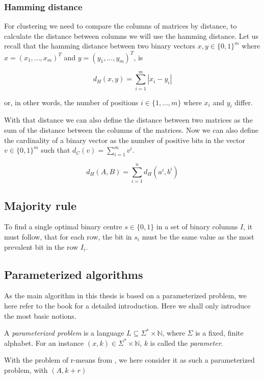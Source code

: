 \documentclass[a4paper]{article}
\begin{document}
\subsubsection{Hamming distance}
For clustering we need to compare the columns of matrices by distance, to calculate the distance
between columns we will use the hamming distance. Let us recall that the hamming distance
between two binary vectors $x,y \in \{0,1\}^m$ where $x=(x_1,...,x_m)^T$ and
$y=(y_1,...,y_m)^T$, is

\[
    d_H(x,y)= \sum_{i = 1}^{m} |x_i - y_i|
\]

or, in other words, the number of positions $i \in \{1,...,m\}$ where $x_i$ and $y_i$ differ.

With that distance we can
also define the distance between two matrices as the sum of the distance between the columns of
the matrices. Now we can also define the cardinality of a binary vector as the number of positive bits in
the vector $v \in \{0,1\}^m$ such that $d_C(v)=\sum_{i = 1}^{m} v^i$.

\[
    d_H(A,B) = \sum_{i = 1}^{n} d_H(a^i, b^i)
\]

\subsection{Majority rule}
To find a single optimal binary centre $s \in \{0,1\}$ in a set of binary columns $I$, it must follow, that for each row,
the bit in $s_i$ must be the same value as the most prevalent bit in the row $I_i$.

\subsection{Parameterized algorithms}
As the main algorithm in this thesis is based on a parameterized problem, we here refer to the
book \cite{param_algo_book} for a detailed introduction. Here we shall only introduce the most
basic notions.

\begin{theoremdefinition}{\cite[p.~12]{param_algo_book}}
    A \textit{parameterized problem} is a language $L \subseteq \Sigma^* \times \mathbb{N}$,
    where $\Sigma$ is a fixed, finite alphabet. For an instance $(x,k) \in \Sigma^* \times \mathbb{N}$,
    $k$ is called the \textit{parameter}.
\end{theoremdefinition}

With the problem of r-means from \cite{fomin_golovach_panolan_2020}, we here consider it as such
a parameterized problem, with $(A,k+r)$
\end{document}
